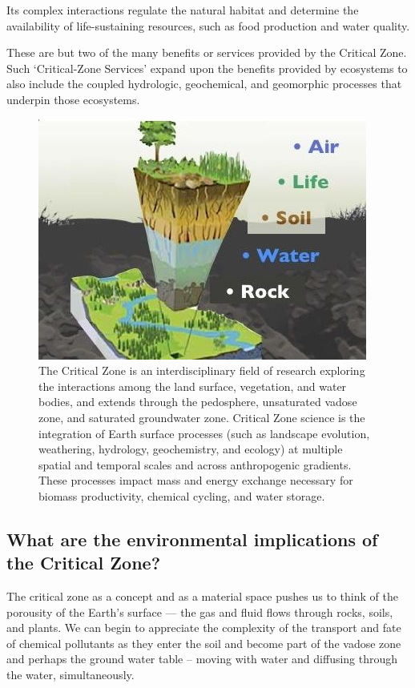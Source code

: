 \documentclass{book}\usepackage{knitr}
\begin{document}
\begin{knitrout}
\begin{kframe}
Its complex interactions regulate the natural habitat and determine the availability of life-sustaining resources, such as food production and water quality.

These are but two of the many benefits or services provided by the Critical Zone. Such `Critical-Zone Services' expand upon the benefits provided by ecosystems to also include the coupled hydrologic, geochemical, and geomorphic processes that underpin those ecosystems.

\begin{figure}
\includegraphics[width=\textwidth]{images/critical-zone/criticalzone.jpg}
\caption{The Critical Zone is an interdisciplinary field of research exploring the interactions among the land surface, vegetation, and water bodies, and extends through the pedosphere, unsaturated vadose zone, and saturated groundwater zone. Critical Zone science is the integration of Earth surface processes (such as landscape evolution, weathering, hydrology, geochemistry, and ecology) at multiple spatial and temporal scales and across anthropogenic gradients. These processes impact mass and energy exchange necessary for biomass productivity, chemical cycling, and water storage.}
\label{fig:criticalzone}
\end{figure}

\subsection{What are the environmental implications of the Critical Zone?}

The critical zone as a concept and as a material space pushes us to think of the porousity of the Earth's surface --- the gas and fluid flows through rocks, soils, and plants. We can begin to appreciate the complexity of the transport and fate of chemical pollutants as they enter the soil and become part of the vadose zone and perhaps the ground water table -- moving with water and diffusing through the water, simultaneously.


\end{kframe}
\end{knitrout}
\end{document}
